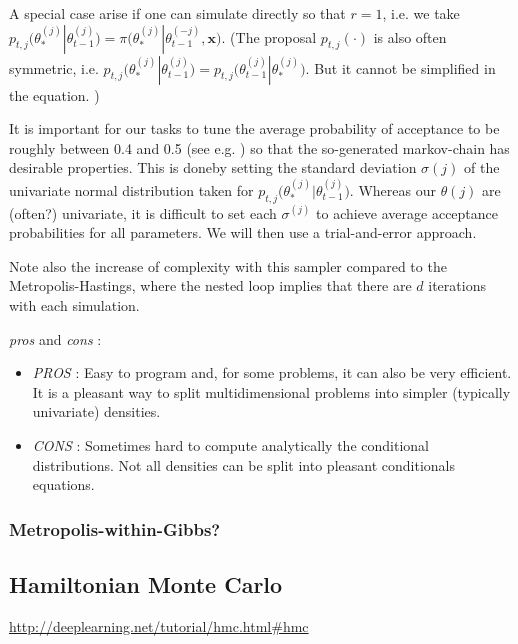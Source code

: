 \documentclass[11pt,a4paper,openany ]{book}
\begin{document}
A special case arise if one can simulate directly so that $r=1$, i.e. we take $p_{t,j}\big(\theta_*^{(j)}|\theta_{t-1}^{(j)}\big)=\pi\big(\theta_*^{(j)}|\theta_{t-1}^{(-j)},\boldsymbol{x}\big)$.
(The proposal $p_{t,j}(\cdot)$ is also often symmetric, i.e.
$p_{t,j}\big(\theta_*^{(j)}|\theta_{t-1}^{(j)}\big)= p_{t,j}\big(\theta_{t-1}^{(j)}|\theta_*^{(j)}\big)$. But it cannot be simplified in the equation. )

It is important for our tasks to tune the average probability of acceptance to be roughly between 0.4 and 0.5 (see e.g. \citet[chapter 11]{gelman_bayesian_2013} ) so that the so-generated markov-chain has desirable properties. This is doneby setting the standard deviation $\sigma{(j)}$ of the univariate normal distribution taken for $p_{t,j}\big(\theta_*^{(j)}|\theta_{t-1}^{(j)}\big)$. Whereas our $\theta{(j)}$ are (often?) univariate, it is difficult to set each $\sigma^{(j)}$ to achieve average acceptance probabilities for all parameters. We will then use a trial-and-error approach.

Note also the increase of complexity with this sampler compared to the Metropolis-Hastings, where the nested loop implies that there are $d$ iterations with each simulation.


\emph{pros} and \emph{cons} : 

\begin{itemize}
	\item \emph{PROS} : Easy to program and, for some problems, it can also be very efficient. It is a pleasant way to split multidimensional problems into simpler (typically univariate) densities.
	\item \emph{CONS} : Sometimes hard to compute analytically the conditional distributions. Not all densities can be split into pleasant conditionals equations.
\end{itemize}



\subsubsection*{Metropolis-within-Gibbs?}



\subsection{Hamiltonian Monte Carlo}

\url{http://deeplearning.net/tutorial/hmc.html#hmc} \\
\end{document}
